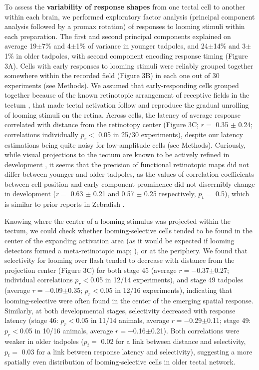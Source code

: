 \documentclass{article}
\begin{document}
To assess the \textbf{variability of response shapes} from one tectal cell to another within each brain, we performed exploratory factor analysis (principal component analysis followed by a promax rotation) of responses to looming stimuli within each preparation. The first and second principal components explained on average 19$\pm$7\% and 4$\pm$1\% of variance in younger tadpoles, and 24$\pm$14\% and 3$\pm$1\% in older tadpoles, with second component encoding response timing (Figure 3A). Cells with early responses to looming stimuli were reliably grouped together somewhere within the recorded field (Figure 3B) in each one out of 30 experiments (see Methods). We assumed that early-responding cells grouped together because of the known retinotopic arrangement of receptive fields in the tectum \citep{ruthazer2004map}, that made tectal activation follow and reproduce the gradual unrolling of looming stimuli on the retina. Across cells, the latency of average response correlated with distance from the retinotopy center (Figure 3C; $r=$ 0.35 $\pm$ 0.24; correlations individually $p_r<$ 0.05 in 25/30 experiments), despite our latency estimations being quite noisy for low-amplitude cells (see Methods). Curiously, while visual projections to the tectum are known to be actively refined in development \citep{sakaguchi1985refinement, ruthazer2004map, munz2014hebbian}, it seems that the precision of functional retinotopic maps did not differ between younger and older tadpoles, as the values of correlation coefficients between cell position and early component prominence did not discernibly change in development ($r=$ 0.63 $\pm$ 0.21 and 0.57 $\pm$ 0.25 respectively, $p_t=$ 0.5), which is similar to prior reports in Zebrafish \citep{avitan2016limitations}.

Knowing where the center of a looming stimulus was projected within the tectum, we could check whether looming-selective cells tended to be found in the center of the expanding activation area (as it would be expected if looming detectors formed a meta-retinotopic map; \citealt{frost2004review}), or at the periphery. We found that selectivity for looming over flash tended to decrease with distance from the projection center (Figure 3C) for both stage 45 (average $r=-$0.37$\pm$0.27; individual correlations $p_r<$0.05 in 12/14 experiments), and stage 49 tadpoles (average $r=-$0.09$\pm$0.35; $p_r<$0.05 in 12/16 experiments), indicating that looming-selective were often found in the center of the emerging spatial response. Similarly, at both developmental stages, selectivity decreased with response latency (stage 46: $p_r<$0.05 in 11/14 animals, average $r=-$0.29$\pm$0.11; stage 49: $p_r<$0.05 in 10/16 animals, average $r=-$0.16$\pm$0.21). Both correlations were weaker in older tadpoles ($p_t=$ 0.02 for a link between distance and selectivity, $p_t=$ 0.03 for a link between response latency and selectivity), suggesting a more spatially even distribution of looming-selective cells in older tectal network.
\end{document}
